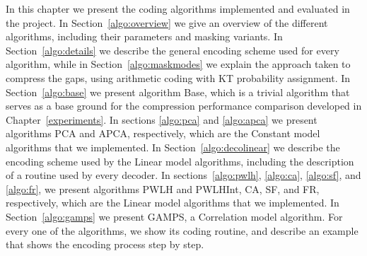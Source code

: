 

In this chapter we present the coding algorithms implemented and evaluated in the project. In Section~\ref{algo:overview} we give an overview of the different algorithms, including their parameters and masking variants. In Section~\ref{algo:details} we describe the general encoding scheme used for every algorithm, while in Section~\ref{algo:maskmodes} we explain the approach taken to compress the gaps, using arithmetic coding with KT probability assignment. In Section~\ref{algo:base} we present algorithm Base, which is a trivial algorithm that serves as a base ground for the compression performance comparison developed in Chapter~\ref{experiments}. In sections \ref{algo:pca} and \ref{algo:apca} we present algorithms PCA and APCA, respectively, which are the Constant model algorithms that we implemented. In Section~\ref{algo:decolinear} we describe the encoding scheme used by the Linear model algorithms, including the description of a routine used by every decoder. In sections~\ref{algo:pwlh}, \ref{algo:ca}, \ref{algo:sf}, and \ref{algo:fr}, we present algorithms PWLH and PWLHInt, CA, SF, and FR, respectively, which are the Linear model algorithms that we implemented. In Section~\ref{algo:gamps} we present GAMPS, a Correlation model algorithm. For every one of the algorithms, we show its coding routine, and describe an example that shows the encoding process step by step.

